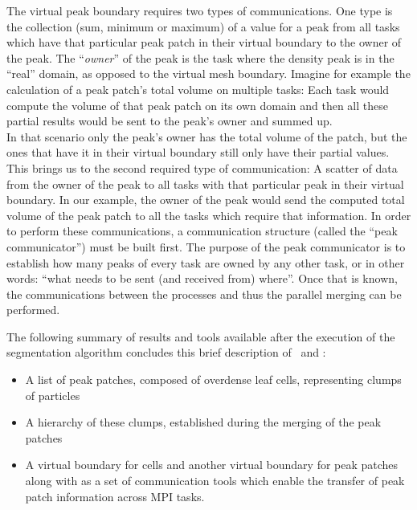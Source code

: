 The virtual peak boundary requires two types of communications. 
One type is the collection (sum, minimum or maximum) of a value for a peak from all tasks which have that particular peak patch in their virtual boundary to the owner of the peak.
The ``\emph{owner}'' of the peak is the task where the density peak is in the ``real'' domain, as opposed to the virtual mesh boundary.
Imagine for example the calculation of a peak patch's total volume on multiple tasks: 
Each task would compute the volume of that peak patch on its own domain and then all these partial results would be sent to the peak's owner and summed up.\\
%
In that scenario only the peak's owner has the total volume of the patch, but the ones that have it in their virtual boundary still only have their partial values.
This brings us to the second required type of communication:
A scatter of data from the owner of the peak to all tasks with that particular peak in their virtual boundary. 
In our example, the owner of the peak would send the computed total volume of the peak patch to all the tasks which require that information. 
%
In order to perform these communications, a communication structure (called the ``peak communicator'') must be built first. 
The purpose of the peak communicator is to establish how many peaks of every task are owned by any other task, or in other words: ``what needs to be sent (and received from) where''.
Once that is known, the communications between the processes and thus the parallel merging can be performed.



The following summary of results and tools available after the execution of the segmentation algorithm concludes this brief description of \phew\ and \ramses:
%
\begin{itemize}
	\item A list of peak patches, composed of overdense leaf cells, representing clumps of particles
	\item A hierarchy of these clumps, established during the merging of the peak patches
	\item A virtual boundary for cells and another virtual boundary for peak patches along with as a set of communication tools which enable the transfer of peak patch information across MPI tasks.
\end{itemize}



